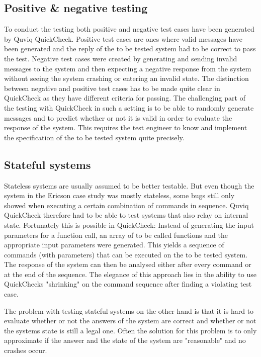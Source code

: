 \documentclass[a4paper, 12pt]{article} %
\begin{document}
\subsection{Positive \& negative testing}

To conduct the testing both positive and negative test cases have been generated by Quviq QuickCheck. Positive test cases are ones where valid messages have been generated and the reply of the to be tested system had to be correct to pass the test. Negative test cases were created by generating and sending invalid messages to the system and then expecting a negative response from the system without seeing the system crashing or entering an invalid state. The distinction between negative and positive test cases has to be made quite clear in QuickCheck as they have different criteria for passing. The challenging part of the testing with QuickCheck in such a setting is to be able to randomly generate messages and to predict whether or not it is valid in order to evaluate the response of the system. This requires the test engineer to know and implement the specification of the to be tested system quite precisely\cite{Arts06}.

\subsection{Stateful systems}

Stateless systems are usually assumed to be better testable. But even though the system in the Ericson case study was mostly stateless, some bugs still only showed when executing a certain combination of commands in sequence. Quviq QuickCheck therefore had to be able to test systems that also relay on internal state. Fortunately this is possible in QuickCheck: Instead of generating the input parameters for a function call, an array of to be called functions and the appropriate input parameters were generated. This yields a sequence of commands (with parameters) that can be executed on the to be tested system. The response of the system can then be analysed either after every command or at the end of the sequence. The elegance of this approach lies in the ability to use QuickChecks "shrinking" on the command sequence after finding a violating test case\cite{Arts06}. 

The problem with testing stateful systems on the other hand is that it is hard to evaluate whether or not the answers of the system are correct and whether or not the systems state is still a legal one. Often the solution for this problem is to only approximate if the answer and the state of the system are "reasonable" and no crashes occur.
\end{document}
